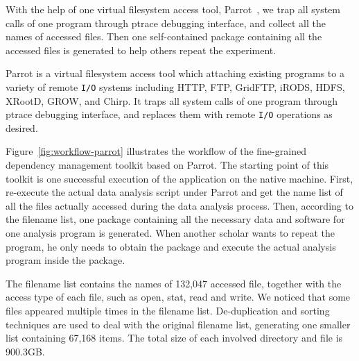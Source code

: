 \documentclass{sig-alternate}
\begin{document}
With the help of one
virtual filesystem access tool, Parrot~\cite{thain2005parrot}, we trap all system calls of one
program through ptrace debugging interface, and collect all the names of accessed files. 
Then one self-contained package containing all the accessed files is generated to help others repeat the experiment.

Parrot is a virtual filesystem access tool which attaching existing programs to
a variety of remote {\tt I/O} systems including 
HTTP, FTP, GridFTP, iRODS, HDFS, XRootD, GROW, and Chirp. It traps all system calls of one program through ptrace
debugging interface, and replaces them with remote {\tt I/O} operations as desired.

Figure~\ref{fig:workflow-parrot} illustrates the workflow of the fine-grained dependency management toolkit based on Parrot.
The starting point of this toolkit is one successful execution of the application on the native machine.
First, re-execute the actual
data analysis script under Parrot and get the name list of all the files actually
accessed during the data analysis process. Then,
according to the filename list, one package containing all the necessary data
and software for one analysis program is generated. When another
scholar wants to repeat the program, he only needs to obtain the package and
execute the actual analysis program inside the package. 

The filename list contains the names of 132,047 accessed file, together with the access type of each file, such as
open, stat, read and write. 
We noticed that some files appeared multiple times in the filename list. 
De-duplication and sorting techniques are used to deal with the original filename list, generating one smaller list containing 67,168 items.
The total size of each involved directory and file is 900.3GB.
\end{document}
